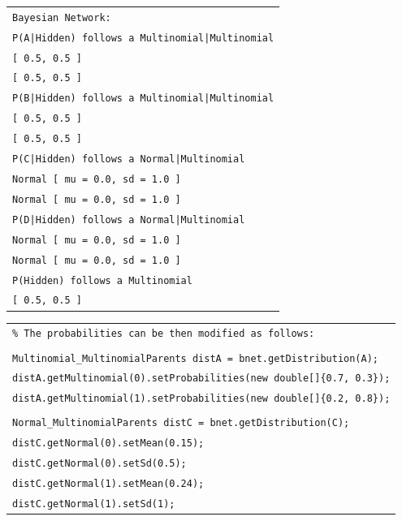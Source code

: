 \begin{table}[H]
\small{\begin{tabular}{l} \\
\texttt{Bayesian Network:}\\
\texttt{P(A|Hidden) follows a Multinomial|Multinomial}\\
\texttt{[ 0.5, 0.5 ]}\\
\texttt{[ 0.5, 0.5 ]}\\
\texttt{P(B|Hidden) follows a Multinomial|Multinomial}\\
\texttt{[ 0.5, 0.5 ]}\\
\texttt{[ 0.5, 0.5 ]}\\
\texttt{P(C|Hidden) follows a Normal|Multinomial}\\
\texttt{Normal [ mu = 0.0, sd = 1.0 ]}\\
\texttt{Normal [ mu = 0.0, sd = 1.0 ]}\\
\texttt{P(D|Hidden) follows a Normal|Multinomial}\\
\texttt{Normal [ mu = 0.0, sd = 1.0 ]}\\
\texttt{Normal [ mu = 0.0, sd = 1.0 ]}\\
\texttt{P(Hidden) follows a Multinomial}\\
\texttt{[ 0.5, 0.5 ]}\\

\end{tabular}}
\end{table}

\begin{table}[H]
\small{\begin{tabular}{l} \\

\texttt{\% The probabilities can be then modified as follows:}\\\\

\texttt{Multinomial\_MultinomialParents distA = bnet.getDistribution(A);}\\
\texttt{distA.getMultinomial(0).setProbabilities(new double[]\{0.7, 0.3\});}\\
\texttt{distA.getMultinomial(1).setProbabilities(new double[]\{0.2, 0.8\});}\\\\

\texttt{Normal\_MultinomialParents distC = bnet.getDistribution(C);}\\
\texttt{distC.getNormal(0).setMean(0.15);}\\
\texttt{distC.getNormal(0).setSd(0.5);}\\
\texttt{distC.getNormal(1).setMean(0.24);}\\
\texttt{distC.getNormal(1).setSd(1);}\\

\end{tabular}}
\end{table}

